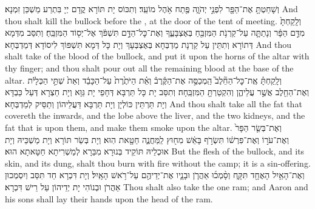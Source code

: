 {וְשָׁחַטְתָּ֥ אֶת־הַפָּ֖ר לִפְנֵ֣י יְהֹוָ֑ה פֶּ֖תַח אֹ֥הֶל מוֹעֵֽד׃
}
{וְתִכּוֹס יָת תּוֹרָא קֳדָם יְיָ בִּתְרַע מַשְׁכַּן זִמְנָא׃}
{And thou shalt kill the bullock before the \lord, at the door of the tent of meeting.}{}
{וְלָֽקַחְתָּ֙ מִדַּ֣ם הַפָּ֔ר וְנָתַתָּ֛ה עַל־קַרְנֹ֥ת הַמִּזְבֵּ֖חַ בְּאֶצְבָּעֶ֑ךָ וְאֶת־כׇּל־הַדָּ֣ם תִּשְׁפֹּ֔ךְ אֶל־יְס֖וֹד הַמִּזְבֵּֽחַ׃
}
{וְתִסַּב מִדְּמָא דְּתוֹרָא וְתִתֵּין עַל קַרְנָת מַדְבְּחָא בְּאֶצְבְּעָךְ וְיָת כָּל דְּמָא תִּשְׁפּוֹךְ לִיסוֹדָא דְּמַדְבְּחָא׃}
{And thou shalt take of the blood of the bullock, and put it upon the horns of the altar with thy finger; and thou shalt pour out all the remaining blood at the base of the altar.}{}
{וְלָֽקַחְתָּ֗ אֶֽת־כׇּל־הַחֵ֘לֶב֮ הַֽמְכַסֶּ֣ה אֶת־הַקֶּ֒רֶב֒ וְאֵ֗ת הַיֹּתֶ֙רֶת֙ עַל־הַכָּבֵ֔ד וְאֵת֙ שְׁתֵּ֣י הַכְּלָיֹ֔ת וְאֶת־הַחֵ֖לֶב אֲשֶׁ֣ר עֲלֵיהֶ֑ן וְהִקְטַרְתָּ֖ הַמִּזְבֵּֽחָה׃
}
{וְתִסַּב יָת כָּל תַּרְבָּא דְּחָפֵי יָת גַּוָּא וְיָת חַצְרָא דְּעַל כַּבְדָּא וְיָת תַּרְתֵּין כּוֹלְיָן וְיָת תַּרְבָּא דַּעֲלֵיהוֹן וְתַסֵּיק לְמַדְבְּחָא׃}
{And thou shalt take all the fat that covereth the inwards, and the lobe above the liver, and the two kidneys, and the fat that is upon them, and make them smoke upon the altar.}{}
{וְאֶת־בְּשַׂ֤ר הַפָּר֙ וְאֶת־עֹר֣וֹ וְאֶת־פִּרְשׁ֔וֹ תִּשְׂרֹ֣ף בָּאֵ֔שׁ מִח֖וּץ לַֽמַּחֲנֶ֑ה חַטָּ֖את הֽוּא׃
}
{וְיָת בְּשַׂר תּוֹרָא וְיָת מַשְׁכֵּיהּ וְיָת אוּכְלֵיהּ תּוֹקֵיד בְּנוּרָא מִבַּרָא לְמַשְׁרִיתָא חַטָּאתָא הוּא׃}
{But the flesh of the bullock, and its skin, and its dung, shalt thou burn with fire without the camp; it is a sin-offering.}{}
{וְאֶת־הָאַ֥יִל הָאֶחָ֖ד תִּקָּ֑ח וְסָ֨מְכ֜וּ אַהֲרֹ֧ן וּבָנָ֛יו אֶת־יְדֵיהֶ֖ם עַל־רֹ֥אשׁ הָאָֽיִל׃}
{וְיָת דִּכְרָא חַד תִּסַּב וְיִסְמְכוּן אַהֲרֹן וּבְנוֹהִי יָת יְדֵיהוֹן עַל רֵישׁ דִּכְרָא׃}
{Thou shalt also take the one ram; and Aaron and his sons shall lay their hands upon the head of the ram.}{}
